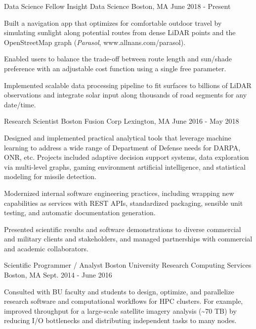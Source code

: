 \documentclass[11pt, letter]{awesome-cv}
\begin{document}
\begin{cventries}
  \cventry
    {Data Science Fellow}
    {Insight Data Science}
    {Boston, MA}
    {June 2018 - Present}
    {
    \begin{cvitems}
      \item Built a navigation app that optimizes for comfortable outdoor travel by simulating sunlight along potential routes from dense LiDAR points and the OpenStreetMap graph (\emph{Parasol}, www.allnans.com/parasol).
      \item Enabled users to balance the trade-off between route length and sun/shade preference with an adjustable cost function using a single free parameter. 
      \item Implemented scalable data processing pipeline to fit surfaces to billions of LiDAR observations and integrate solar input along thousands of road segments for any date/time.
    \end{cvitems}
    }
  \cventry
    {Research Scientist}
    {Boston Fusion Corp}
    {Lexington, MA}
    {June 2016 - May 2018}
    {
      \begin{cvitems}
        \item {Designed and implemented practical analytical tools that leverage machine learning to address a wide range of Department of Defense needs for DARPA, ONR, etc. Projects included adaptive decision support systems, data exploration via multi-level graphs, gaming environment artificial intelligence, and statistical modeling for missile detection.}
        \item {Modernized internal software engineering practices, including wrapping new capabilities as services with REST APIs, standardized packaging, sensible unit testing, and automatic documentation generation.}
        \item {Presented scientific results and software demonstrations to diverse commercial and military clients and stakeholders, and managed partnerships with commercial and academic collaborators.}
      \end{cvitems}
    }
  \cventry
    {Scientific Programmer / Analyst}
    {Boston University Research Computing Services}
    {Boston, MA}
    {Sept. 2014 - June 2016}
    {
      \begin{cvitems}
        \item {Consulted with BU faculty and students to design, optimize, and parallelize research software and computational workflows for HPC clusters. For example, improved throughput for a large-scale satellite imagery analysis (\textasciitilde70 TB) by reducing I/O bottlenecks and distributing independent tasks to many nodes.}

\end{cvitems}}
\end{cventries}
\end{document}
